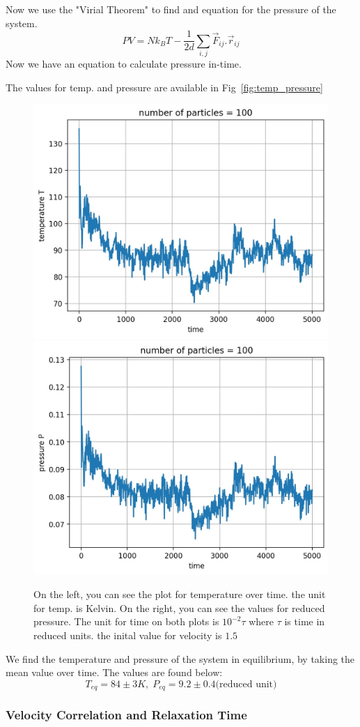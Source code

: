 \documentclass[12pt, a4paper]{article}
\begin{document}
	Now we use the "Virial Theorem" to find and equation for the pressure of the system.
	\begin{equation}
		P V = N k_B T - \frac{1}{2d} \sum_{i,j} \vec{F}_{ij}.\vec{r}_{ij}
	\end{equation}
	 Now we have an equation to calculate pressure in-time. 
	 
	 The values for temp. and pressure are available in Fig~\ref{fig:temp_pressure}
	 
	 \begin{figure}[h!]
		\centering
		\includegraphics[width=.45\linewidth]{../results/temp100_5000.jpg}
		\includegraphics[width=.45\linewidth]{../results/pressure100_5000.jpg}
		\caption{On the left, you can see the plot for temperature over time. the unit for temp. is Kelvin. On the right, you can see the values for 
		reduced pressure. The unit for time on both plots is $10^{-2} \tau$ where $\tau$ is time in reduced units.
		the inital value for velocity is $1.5$}
	 \end{figure}
 
 	We find the temperature and pressure of the system in equilibrium, by taking the mean value over time. The values are found below:
 	\begin{equation*}
 		T_{eq} = 84 \pm 3 K, \; P_{eq} = 9.2 \pm 0.4 \text{(reduced unit)}
 	\end{equation*}
	
	\subsubsection{Velocity Correlation and Relaxation Time}
	
	
	
\end{document}
